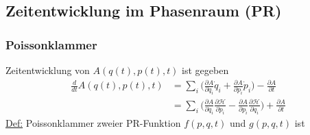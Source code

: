 \documentclass[titlepage,12pt,a4paper,ngerman]{report}
\newcommand{\ham}{\mathcal{H}}
\begin{document}

\subsection{Zeitentwicklung im Phasenraum (PR)}
\subsubsection{Poissonklammer}
Zeitentwicklung von $ A(q(t) , p(t) , t) $ ist gegeben
\begin{align*}
\frac{d}{dt} A(q(t),p(t),t) &= \sum_i \bigg( \frac{\partial A}{\partial q_i} \dot{q}_i + \frac{\partial A}{\partial p_i} \dot{p}_i \bigg) - \frac{\partial A}{\partial t}\\
&= \sum_i \bigg( \frac{\partial A}{\partial q_i} \frac{\partial \ham}{\partial p_i} - \frac{\partial A}{\partial p_i} \frac{\partial \ham}{\partial q_i} \bigg) + \frac{\partial A}{\partial t}
\end{align*}
\underline{Def:} Poissonklammer zweier PR-Funktion $ f(p,q,t) $ und $ g(p,q,t) $ ist
\end{document}
